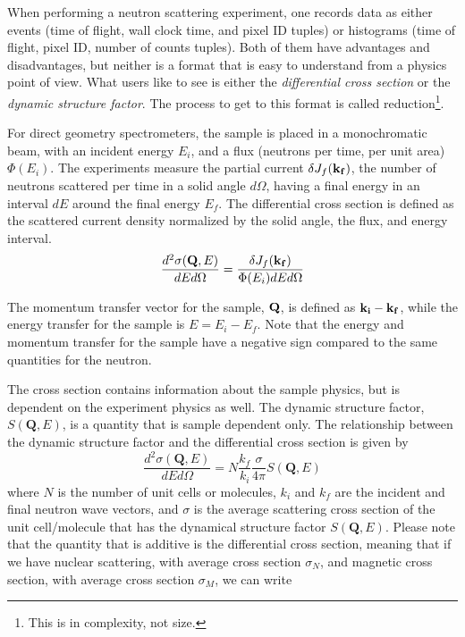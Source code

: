 When performing a neutron scattering experiment, one records data as either events (time of flight, wall clock time, and pixel ID tuples) or histograms (time of flight, pixel ID, number of counts tuples). Both of them have advantages and disadvantages, but neither is a format that is easy to understand from a physics point of view. What users like to see is either the {\it differential cross section} or the {\it dynamic structure factor}. The process to get to this format is called reduction\footnote{This is in complexity, not size.}. 

For direct geometry spectrometers, the sample is placed in a monochromatic beam, with an incident energy $E_i$, and a flux (neutrons per time, per unit area) $\Phi(E_i)$. 
The experiments measure the partial current $\delta J_f(\bf{k}_f)$, the number of neutrons scattered per time in a solid angle $d\Omega$, having a final energy in an interval $dE$ around the final energy $E_f$. The differential cross section is defined as the scattered current density normalized by the solid angle, the flux, and energy interval.
\begin{equation}\label{eq:crosssection}
\frac{d^2\sigma(\textbf{Q},E)}{dE d\Omega}=\frac{\delta J_f(\bf{k}_f)}{\Phi(E_i) dE d\Omega}
\end{equation} 

The momentum transfer vector for the sample, $\bf Q$, is defined as $\bf{k}_i - \bf{k}_f$, while the energy transfer for the sample is $E = E_i - E_f$. Note that the energy and momentum transfer for the sample have a negative sign compared to the same quantities for the neutron.

The cross section contains information about the sample physics, but is dependent on the experiment physics as well. The dynamic structure factor, $S(\textbf{Q},E)$, is a quantity that is sample dependent only. The relationship between the dynamic structure factor and the differential cross section is given by
\begin{equation}\label{eq:structurefactor}
\frac{d^2\sigma(\textbf{Q},E)}{dE d\Omega}=N\frac{k_f}{k_i}\frac{\sigma}{4\pi} S(\textbf{Q},E)
\end{equation}
where $N$ is the number of unit cells or molecules, $k_i$ and $k_f$ are the incident and final neutron wave vectors, and $\sigma$ is the average scattering cross section of the unit cell/molecule that has the dynamical structure factor $S(\textbf{Q},E)$. Please note that the quantity that is additive is the differential cross section, meaning that if we have nuclear scattering, with average cross section $\sigma_N$, and magnetic cross section, with average cross section $\sigma_M$, we can write 
  
